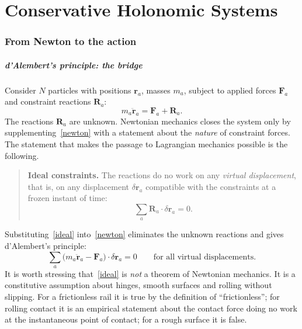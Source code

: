 \chapter{Conservative Holonomic Systems}
\label{chs}


\subsection{From Newton to the action}
\label{newton-to-action}

\paragraph{d'Alembert's principle: the bridge}

Consider $N$ particles with positions $\mathbf r_a$, masses $m_a$, subject to
applied forces $\mathbf F_a$ and constraint reactions $\mathbf R_a$:
\begin{equation}
  m_a\ddot{\mathbf r}_a=\mathbf F_a+\mathbf R_a .
  \label{newton}
\end{equation}
The reactions $\mathbf R_a$ are unknown. Newtonian mechanics closes the system
only by supplementing~\eqref{newton} with a statement about the
\emph{nature} of constraint forces. The statement that makes the passage to
Lagrangian mechanics possible is the following.

\begin{quote}
\textbf{Ideal constraints.} The reactions do no work on any \emph{virtual
displacement}, that is, on any displacement $\delta\mathbf r_a$ compatible with
the constraints at a frozen instant of time:
\begin{equation}
  \sum_a \mathbf R_a\cdot\delta\mathbf r_a = 0 .
  \label{ideal}
\end{equation}
\end{quote}

Substituting~\eqref{ideal} into~\eqref{newton} eliminates the unknown
reactions and gives d'Alembert's principle:
\begin{equation}
  \sum_a\bigl(m_a\ddot{\mathbf r}_a-\mathbf F_a\bigr)\cdot\delta\mathbf r_a=0
  \qquad\text{for all virtual displacements.}
  \label{dalembert}
\end{equation}
It is worth stressing that~\eqref{ideal} is \emph{not} a theorem of
Newtonian mechanics. It is a constitutive assumption about hinges, smooth
surfaces and rolling without slipping. For a frictionless rail it is true by
the definition of ``frictionless''; for rolling contact it is an empirical
statement about the contact force doing no work at the instantaneous point of
contact; for a rough surface it is false.

